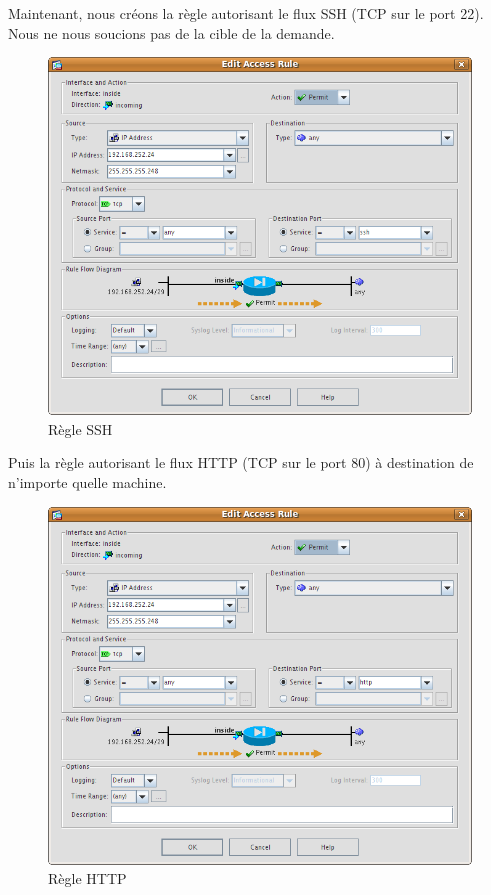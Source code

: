\documentclass[a4paper,12pt]{article}
\begin{document}
\newpage
Maintenant, nous créons la règle autorisant le flux SSH (TCP sur le port 22). Nous ne nous soucions pas de la cible de la demande.
\begin{figure}[H]
	\center
	\includegraphics[width=15cm]{img/6-policyinsideanyssh.png}
	\caption{Règle SSH}
\end{figure}


\newpage
Puis la règle autorisant le flux HTTP (TCP sur le port 80) à destination de n'importe quelle machine.
\begin{figure}[H]
	\center
	\includegraphics[width=15cm]{img/7-policyinsidehttpany.png}
	\caption{Règle HTTP}
\end{figure}
\end{document}
